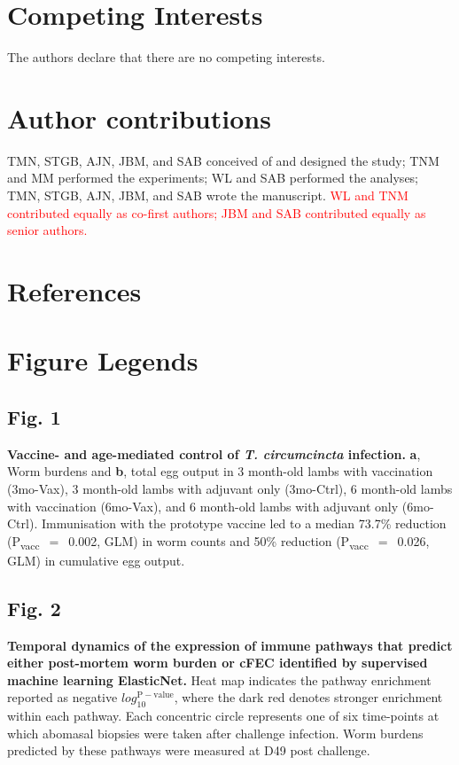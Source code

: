 \documentclass[a4paper, hidelinks, 11pt]{article}
\begin{document}
\section{Competing Interests}
The authors declare that there are no competing interests.

\section{Author contributions}

TMN, STGB, AJN, JBM, and SAB conceived of and designed the study; TNM and MM performed the experiments; WL and SAB performed the analyses; TMN, STGB, AJN, JBM, and SAB wrote the manuscript. \textcolor{red}{WL and TNM contributed equally as co-first authors; JBM and SAB contributed equally as senior authors.}


\endgroup

\section{References}
\printbibliography[heading=none]

\section{Figure Legends}

\subsection{Fig. 1} \label{fig:parasites}

\textbf{Vaccine- and age-mediated control of \emph{T. circumcincta} infection.} \textbf{a}, Worm burdens and \textbf{b}, total egg output in 3 month-old lambs with vaccination (3mo-Vax), 3 month-old lambs with adjuvant only (3mo-Ctrl), 6 month-old lambs with vaccination (6mo-Vax), and 6 month-old lambs with adjuvant only (6mo-Ctrl). Immunisation with the prototype vaccine led to a median 73.7\% reduction (P\textsubscript{vacc}~$=$~0.002, GLM) in worm counts and 50\% reduction (P\textsubscript{vacc}~$=$~0.026, GLM) in cumulative egg output.



\subsection{Fig. 2} \label{fig:circular}

\textbf{Temporal dynamics of the expression of immune
        pathways that predict either post-mortem worm burden or
        cFEC identified by supervised machine learning
        ElasticNet.} Heat map indicates the pathway enrichment
        reported as negative $log_{10}^{\mathrm{P-value}}$,
        where the dark red denotes stronger enrichment within
        each pathway. Each concentric circle represents one of
        six time-points at which abomasal biopsies were taken
        after challenge infection. Worm burdens predicted by these
        pathways were measured at D49 post challenge.
\end{document}
